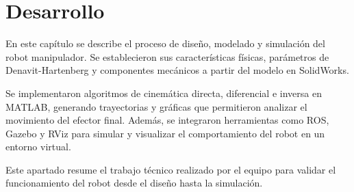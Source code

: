 \chapter{Desarrollo} \label{chap:desarrollo}
En este capítulo se describe el proceso de diseño, modelado y simulación del robot manipulador. Se establecieron sus características físicas, parámetros de Denavit-Hartenberg y componentes mecánicos a partir del modelo en SolidWorks.

Se implementaron algoritmos de cinemática directa, diferencial e inversa en MATLAB, generando trayectorias y gráficas que permitieron analizar el movimiento del efector final. Además, se integraron herramientas como ROS, Gazebo y RViz para simular y visualizar el comportamiento del robot en un entorno virtual.

Este apartado resume el trabajo técnico realizado por el equipo para validar el funcionamiento del robot desde el diseño hasta la simulación.